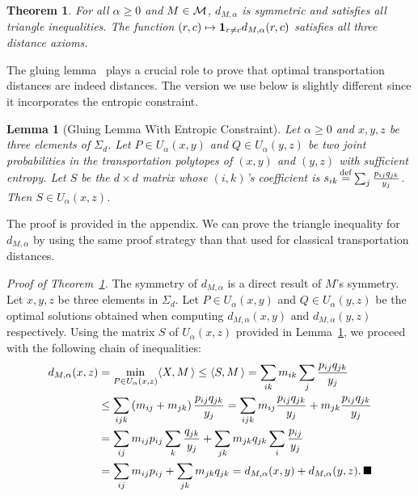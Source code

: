 \documentclass{amsart} %
\newtheorem{theorem}{Theorem}
\newtheorem{lemma}{Lemma}
\begin{document}
\begin{theorem}\label{theo:metric} For all $\alpha\geq 0$ and $M\in\mathcal{M}$, $d_{M,\alpha}$ is symmetric and satisfies all triangle inequalities. The function $(r,c)\mapsto \mathbf 1_{r\ne c} d_{M,\alpha}(r,c)$ satisfies all three distance axioms. 
\end{theorem}
The gluing lemma~\cite[Lemma 7.6]{villani} plays a crucial role to prove that optimal transportation distances are indeed distances. The version we use below is slightly different since it incorporates the entropic constraint.
\begin{lemma}[Gluing Lemma With Entropic Constraint]\label{lem:gluing} Let $\alpha\geq 0$ and $x,y,z$ be three elements of $\Sigma_d$. Let $P\in U_\alpha(x,y)$ and $Q\in U_\alpha(y,z)$ be two joint probabilities in the transportation polytopes of $(x,y)$ and $(y,z)$ with sufficient entropy. Let $S$ be the $d\times d$ matrix whose $(i,k)$'s coefficient is $s_{ik}\operatorname{\overset{\operatorname{def}}{=}} \sum_{j} \frac{p_{ij}q_{jk}}{y_j}$. Then $S\in U_{\alpha}(x,z)$.
\end{lemma}
The proof is provided in the appendix. We can prove the triangle inequality for $d_{M,\alpha}$ by using the same proof strategy than that used for classical transportation distances.

\emph{Proof of Theorem~\ref{theo:metric}.} The symmetry of $d_{M,\alpha}$ is a direct result of $M$'s symmetry. Let $x,y,z$ be three elements in $\Sigma_d$. Let $P\in U_{\alpha}(x,y)$ and $Q\in U_{\alpha}(y,z)$ be the optimal solutions obtained when computing $d_{M,\alpha}(x,y)$ and $d_{M,\alpha}(y,z)$ respectively. Using the matrix $S$ of $U_{\alpha}(x,z)$ provided in Lemma~\ref{lem:gluing}, we proceed with the following chain of inequalities:
	$$\begin{aligned}
	d_{M,\alpha}(x,z)&=\min_{P\in U_\alpha(x,z)}\langle X , M\,\rangle \leq \langle S , M\,\rangle = \sum_{ik} m_{ik}\sum_{j} \frac{p_{ij}q_{jk}}{y_j} \\ & \leq \sum_{ijk} \left(m_{ij}+m_{jk}\right) \frac{p_{ij}q_{jk}}{y_j} = \sum_{ijk} m_{ij} \frac{p_{ij}q_{jk}}{y_j} +m_{jk} \frac{p_{ij}q_{jk}}{y_j}  \\
	& =\sum_{ij} m_{ij}p_{ij} \sum_k \frac{q_{jk}}{y_j} + \sum_{jk} m_{jk} q_{jk} \sum_i \frac{p_{ij}}{y_j}\\
	&= \sum_{ij} m_{ij}p_{ij} + \sum_{jk} m_{jk} q_{jk} = d_{M,\alpha}(x,y)+d_{M,\alpha}(y,z).\,\blacksquare\end{aligned}
	$$

\end{document}
